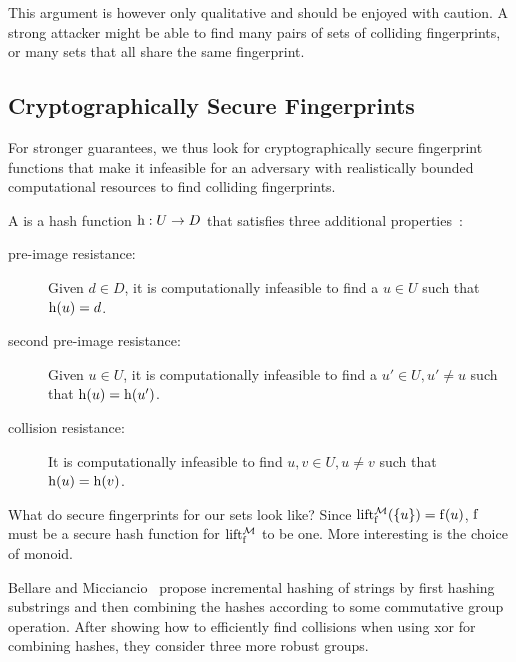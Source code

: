 \documentclass[conference]{IEEEtran}
\begin{document}
This argument is however only qualitative and should be enjoyed with caution. A strong attacker might be able to find many pairs of sets of colliding fingerprints, or many sets that all share the same fingerprint.

\subsection{Cryptographically Secure Fingerprints}

For stronger guarantees, we thus look for cryptographically secure fingerprint functions that make it infeasible for an adversary with realistically bounded computational resources to find colliding fingerprints.

\begin{definition}
A  is a hash function ${\operatorname{h}}: {U} \rightarrow {D}$ that satisfies three additional properties~\cite{menezes2018handbook}:

\begin{description}
  \item[pre-image resistance:] Given $d \in D$, it is computationally infeasible to find a $u \in U$ such that $\operatorname{h}(u) = d$.
  \item[second pre-image resistance:] Given $u \in U$, it is computationally infeasible to find a $u' \in U, u' \neq u$ such that $\operatorname{h}(u) = \operatorname{h}(u')$.
  \item[collision resistance:] It is computationally infeasible to find $u, v \in U, u \neq v$ such that $\operatorname{h}(u) = \operatorname{h}(v)$.
\end{description}
\end{definition}

What do secure fingerprints for our sets look like? Since $\operatorname{lift_{\operatorname{f}}^{\mathcal{M}}}(\{u\}) = \operatorname{f}(u)$, $\operatorname{f}$ must be a secure hash function for $\operatorname{lift_{\operatorname{f}}^{\mathcal{M}}}$ to be one. More interesting is the choice of monoid.

Bellare and Micciancio~\cite{bellare1997new} propose incremental hashing of strings by first hashing substrings and then combining the hashes according to some commutative group operation. After showing how to efficiently find collisions when using xor for combining hashes, they consider three more robust groups.

\end{document}
